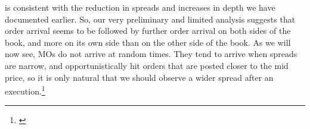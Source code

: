\documentclass[12pt,a4paper]{cau_thesis}
\begin{document}
is consistent with the reduction in spreads and increases in depth we
have documented earlier. So, our very preliminary and limited
analysis suggests that order arrival seems to be followed by further
order arrival on both sides of the book, and more on its own side
than on the other side of the book. As we will now see, MOs do not
arrive at random times. They tend to arrive when spreads are narrow,
and opportunistically hit orders that are posted closer to the mid
price, so it is only natural that we should observe a wider spread
after an execution.\footnote{\cite[See
    ][,p.87]{cartea2015algorithmic}}
\begin{figure}[htbp]
    \vspace*{0.5cm}
    \centering
    \label{fig:market_impact}
\end{figure}
\end{document}
